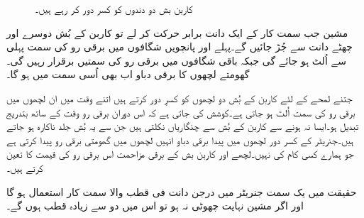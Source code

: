 \begin{figure}
%
\caption{کاربن بش دو دندوں کو کسر دور کر رہے ہیں۔}
\label{شکل_یکسمتی_دندے_کسرے_دور}
\end{figure}

مشین جب سمت کار کے ایک دانت برابر حرکت کر لے تو کاربن کے بُش دوسرے اور چھٹے دانت سے جُڑ جائیں گے۔پہلے اور پانچویں شگافوں میں برقی رو کی سمت پہلی سے اُلٹ ہو جائے گی جبکہ باقی شگافوں میں برقی رو کی سمتیں برقرار رہیں گی۔گھومتے لچھوں کا برقی دباو اب بھی اُسی سمت میں ہو گا۔

جتنے لمحے کے لئے  کاربن کے بُش دو لچھوں کو کسرِ دور کرتے ہیں اتنے وقت میں ان لچھوں میں برقی رو کی سمت اُلٹ ہو جاتی ہے۔کوشش کی جاتی ہے کہ  اس دوران برقی رو وقت کے ساتھ بتدریج تبدیل ہو۔ایسا نہ ہونے سے کاربن کے بُش سے چنگاریاں نکلتی ہیں جن سے یہ بُش جلد ناکارہ ہو جاتے ہیں۔جنریٹر کے کسر دور لچھوں میں پیدا برقی دباو انہیں لچھوں میں گھومتی برقی رو پیدا کرتی ہے جو ہمارے کسی کام کی نہیں۔لچھے اور کاربن بش کے برقی مزاحمت اس برقی رو کی قیمت کا تعین کرتے ہیں۔ 

حقیقت میں یک سمت  جنریٹر میں درجن دانت فی قطب والا سمت کار استعمال ہو گا اور اگر مشین نہایت چھوٹی نہ ہو تو اس میں دو سے زیادہ قطب ہوں گے۔



